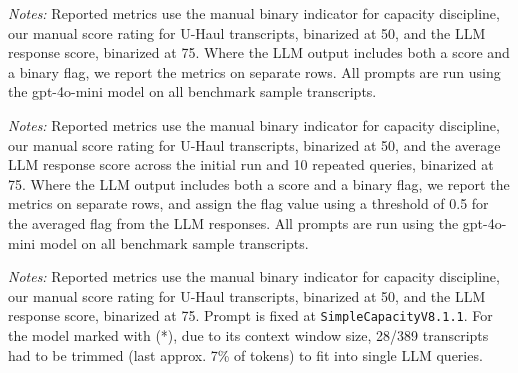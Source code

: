 \begin{table}[!htbp]
    \centering
    \caption{Prompt Variants Benchmarking (First LLM Run)}
    \label{tab:si_prompt_benchmark_first_run}
    \setlength{\tabcolsep}{3pt}
    \scriptsize
    \resizebox{\textwidth}{!}{}
    \begin{minipage}{\textwidth}
        \vspace{1em}
        \footnotesize
        \textit{Notes:} Reported metrics use the \textcite{aryal2022coordinated} manual binary indicator for capacity discipline, our manual score rating for U-Haul transcripts, binarized at 50, and the LLM response score, binarized at 75. Where the LLM output includes both a score and a binary flag, we report the metrics on separate rows. All prompts are run using the gpt-4o-mini model on all benchmark sample transcripts.
    \end{minipage}
\end{table}
\FloatBarrier

\begin{table}[ht]
    \centering
    \caption{Prompt Variants Benchmarking (11 LLM Runs)}
    \label{tab:si_prompt_benchmark_avg11}
    \setlength{\tabcolsep}{3pt}
    \scriptsize
    \resizebox{\textwidth}{!}{}
    \begin{minipage}{\textwidth}
        \vspace{1em}
        \footnotesize
        \textit{Notes:} Reported metrics use the \textcite{aryal2022coordinated} manual binary indicator for capacity discipline, our manual score rating for U-Haul transcripts, binarized at 50, and the average LLM response score across the initial run and 10 repeated queries, binarized at 75. Where the LLM output includes both a score and a binary flag, we report the metrics on separate rows, and assign the flag value using a threshold of 0.5 for the averaged flag from the LLM responses. All prompts are run using the gpt-4o-mini model on all benchmark sample transcripts.
    \end{minipage}
\end{table}
\FloatBarrier

\begin{table}[ht]
    \centering
    \caption{LLMs Benchmarking (First LLM Run)}
    \label{tab:si_model_benchmark_first_run}
    \setlength{\tabcolsep}{3pt}
    \scriptsize
    \resizebox{\textwidth}{!}{}
    \begin{minipage}{\textwidth}
        \vspace{1em}
        \footnotesize
        \textit{Notes:} Reported metrics use the \textcite{aryal2022coordinated} manual binary indicator for capacity discipline, our manual score rating for U-Haul transcripts, binarized at 50, and the LLM response score, binarized at 75. Prompt is fixed at \texttt{SimpleCapacityV8.1.1}. For the model marked with (*), due to its context window size, 28/389 transcripts had to be trimmed (last approx. 7\% of tokens) to fit into single LLM queries.
    \end{minipage}
\end{table}
\FloatBarrier
